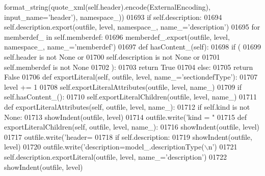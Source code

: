 \begin{DoxyCode}
{{{{{{{{{{{{{{{{{{{{{{{{{{{{{{{{{{{{{{{{{{{{{{{{{{{{{{{{{{{{{{{{{{{{{{{{{{{{{{{{{{{{{{{{{{{{{{{{{{{{{{{{{{{{{{{{      format_string(quote_xml(self.header).encode(ExternalEncoding), input\_name=\textcolor{stringliteral}{'header'}), namespace\_))
01693         \textcolor{keywordflow}{if} self.description:
01694             self.description.export(outfile, level, namespace\_, name\_=\textcolor{stringliteral}{'description'})
01695         \textcolor{keywordflow}{for} memberdef\_ \textcolor{keywordflow}{in} self.memberdef:
01696             memberdef\_.export(outfile, level, namespace\_, name\_=\textcolor{stringliteral}{'memberdef'})
01697     \textcolor{keyword}{def }hasContent_(self):
01698         \textcolor{keywordflow}{if} (
01699             self.header \textcolor{keywordflow}{is} \textcolor{keywordflow}{not} \textcolor{keywordtype}{None} \textcolor{keywordflow}{or}
01700             self.description \textcolor{keywordflow}{is} \textcolor{keywordflow}{not} \textcolor{keywordtype}{None} \textcolor{keywordflow}{or}
01701             self.memberdef \textcolor{keywordflow}{is} \textcolor{keywordflow}{not} \textcolor{keywordtype}{None}
01702             ):
01703             \textcolor{keywordflow}{return} \textcolor{keyword}{True}
01704         \textcolor{keywordflow}{else}:
01705             \textcolor{keywordflow}{return} \textcolor{keyword}{False}
01706     \textcolor{keyword}{def }exportLiteral(self, outfile, level, name\_='sectiondefType'):
01707         level += 1
01708         self.exportLiteralAttributes(outfile, level, name\_)
01709         \textcolor{keywordflow}{if} self.hasContent_():
01710             self.exportLiteralChildren(outfile, level, name\_)
01711     \textcolor{keyword}{def }exportLiteralAttributes(self, outfile, level, name\_):
01712         \textcolor{keywordflow}{if} self.kind \textcolor{keywordflow}{is} \textcolor{keywordflow}{not} \textcolor{keywordtype}{None}:
01713             showIndent(outfile, level)
01714             outfile.write(\textcolor{stringliteral}{'kind = "%
01715     \textcolor{keyword}{def }exportLiteralChildren(self, outfile, level, name\_):
01716         showIndent(outfile, level)
01717         outfile.write(\textcolor{stringliteral}{'header=%
01718         \textcolor{keywordflow}{if} self.description:
01719             showIndent(outfile, level)
01720             outfile.write(\textcolor{stringliteral}{'description=model\_.descriptionType(\(\backslash\)n'})
01721             self.description.exportLiteral(outfile, level, name\_=\textcolor{stringliteral}{'description'})
01722             showIndent(outfile, level)
}}}}}}}}}}}}}}}}}}}}}}}}}}}}}}}}}}}}}}}}}}}}}}}}}}}}}}}}}}}}}}}}}}}}}}}}}}}}}}}}}}}}}}}}}}}}}}}}}}}}}}}}}}}}}}}}}}
\end{DoxyCode}
